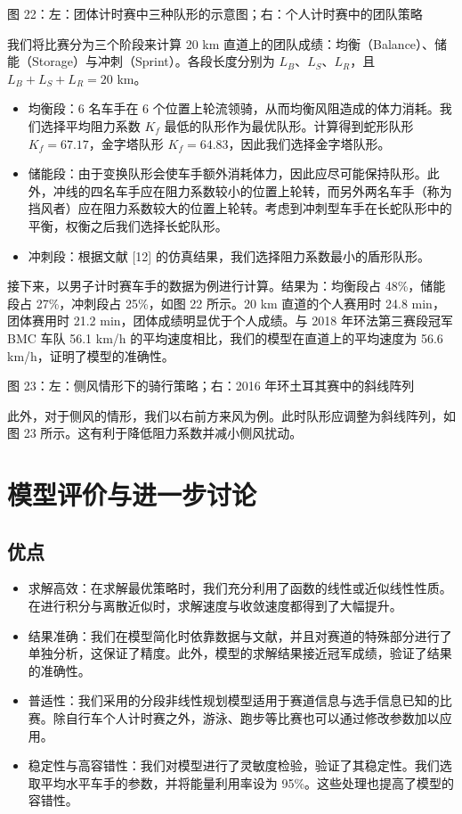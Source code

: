 \documentclass[11pt,a4paper]{ctexart}
\begin{document}
图 22：左：团体计时赛中三种队形的示意图；右：个人计时赛中的团队策略

我们将比赛分为三个阶段来计算 20 km 直道上的团队成绩：均衡（Balance）、储能（Storage）与冲刺（Sprint）。各段长度分别为 $L_B$、$L_S$、$L_R$，且 $L_B+L_S+L_R=20$ km。

\begin{itemize}
\item 均衡段：6 名车手在 6 个位置上轮流领骑，从而均衡风阻造成的体力消耗。我们选择平均阻力系数 $K_f$ 最低的队形作为最优队形。计算得到蛇形队形 $K_f=67.17$，金字塔队形 $K_f=64.83$，因此我们选择金字塔队形。
\item 储能段：由于变换队形会使车手额外消耗体力，因此应尽可能保持队形。此外，冲线的四名车手应在阻力系数较小的位置上轮转，而另外两名车手（称为挡风者）应在阻力系数较大的位置上轮转。考虑到冲刺型车手在长蛇队形中的平衡，权衡之后我们选择长蛇队形。
\item 冲刺段：根据文献 [12] 的仿真结果，我们选择阻力系数最小的盾形队形。
\end{itemize}

接下来，以男子计时赛车手的数据为例进行计算。结果为：均衡段占 48\%，储能段占 27\%，冲刺段占 25\%，如图 22 所示。20 km 直道的个人赛用时 24.8 min，团体赛用时 21.2 min，团体成绩明显优于个人成绩。与 2018 年环法第三赛段冠军 BMC 车队 56.1 km/h 的平均速度相比，我们的模型在直道上的平均速度为 56.6 km/h，证明了模型的准确性。

图 23：左：侧风情形下的骑行策略；右：2016 年环土耳其赛中的斜线阵列

此外，对于侧风的情形，我们以右前方来风为例。此时队形应调整为斜线阵列，如图 23 所示。这有利于降低阻力系数并减小侧风扰动。

\section{模型评价与进一步讨论}

\subsection{优点}

\begin{itemize}
\item 求解高效：在求解最优策略时，我们充分利用了函数的线性或近似线性性质。在进行积分与离散近似时，求解速度与收敛速度都得到了大幅提升。
\item 结果准确：我们在模型简化时依靠数据与文献，并且对赛道的特殊部分进行了单独分析，这保证了精度。此外，模型的求解结果接近冠军成绩，验证了结果的准确性。
\item 普适性：我们采用的分段非线性规划模型适用于赛道信息与选手信息已知的比赛。除自行车个人计时赛之外，游泳、跑步等比赛也可以通过修改参数加以应用。
\item 稳定性与高容错性：我们对模型进行了灵敏度检验，验证了其稳定性。我们选取平均水平车手的参数，并将能量利用率设为 95\%。这些处理也提高了模型的容错性。
\end{itemize}
\end{document}
